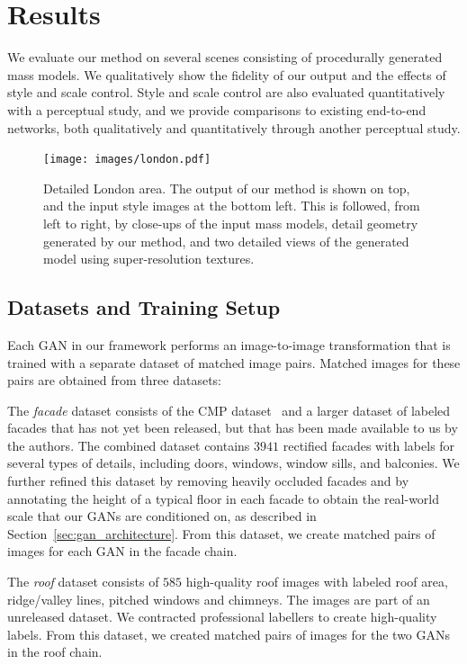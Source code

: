 \section{Results}
\label{sec:results}
We evaluate our method on several scenes consisting of procedurally generated mass models. 
We qualitatively show the fidelity of our output and the effects of style and scale control. Style and scale control are also evaluated quantitatively with a perceptual study, and we provide comparisons to existing end-to-end networks, both qualitatively and quantitatively through another perceptual study. 

\begin{figure}[t!]
    \centering
    \texttt{[image: images/london.pdf]}
    \caption{Detailed London area. The output of our method is shown on top, and the input style images at the bottom left. This is followed, from left to right, by close-ups of the input mass models, detail geometry generated by our method, and two detailed views of the generated model using super-resolution textures.}
    \label{fig:london}
\end{figure}

\subsection{Datasets and Training Setup}

Each GAN in our framework performs an image-to-image transformation that is trained with a separate dataset of matched image pairs. Matched images for these pairs are obtained from three datasets:

The \emph{facade} dataset consists of the CMP dataset~\cite{cmp_dataset} and a larger dataset of labeled facades that has not yet been released, but that has been made available to us by the authors. The combined dataset contains $3941$ rectified facades with labels for several types of details, including doors, windows, window sills, and balconies.
%
We further refined this dataset by removing heavily occluded facades and by annotating the height of a typical floor in each facade to obtain the real-world scale that our GANs are conditioned on, as described in Section~\ref{sec:gan_architecture}.
%
From this dataset, we create matched pairs of images for each GAN in the facade chain.

The \emph{roof} dataset consists of $585$ high-quality roof images with labeled roof area, ridge/valley lines, pitched windows and chimneys. The images are part of an unreleased dataset. We contracted professional labellers to create high-quality labels.
%
From this dataset, we created matched pairs of images for the two GANs in the roof chain.


